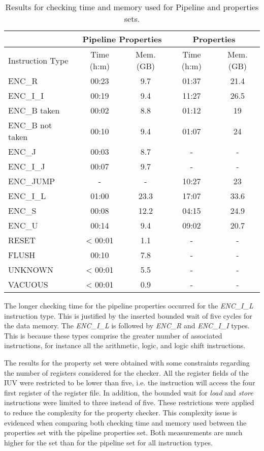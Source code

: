 \begin{table*}[htb!] 
	\centering 
	\caption{Results for checking time and memory used for Pipeline and \SSQED{} properties sets.} 
	\label{tab:pipe-s2qed-check-resutls}
	\begin{tabular}{lcccc}
          & \multicolumn{2}{c}{\textbf{Pipeline Properties}} & \multicolumn{2}{c}{\textbf{\SSQED{} Properties}} \\
          \hline
         Instruction Type & Time (h:m) & Mem.(GB) & Time (h:m) & Mem.(GB)  \\
          \hline
        ENC\_R & 00:23 & 9.7 & 01:37 &  21.4  \\
        ENC\_I\_I & 00:19 & 9.4 & 11:27 &  26.5\\
        ENC\_B taken  & 00:02 & 8.8 & 01:12 & 19\\
        ENC\_B not taken & 00:10 & 9.4 & 01:07 &  24  \\
        ENC\_J & 00:03 & 8.7 & - &  -  \\
        ENC\_I\_J & 00:07 & 9.7 & - &  -  \\
        ENC\_JUMP & - & - & 10:27 &  23  \\
        ENC\_I\_L & 01:00 & 23.3 & 17:07 & 33.6  \\
        ENC\_S & 00:08 & 12.2 & 04:15 &  24.9  \\
        ENC\_U & 00:14 & 9.4 & 09:02 & 20.7  \\
        RESET & < 00:01 & 1.1 & - &  -  \\
        FLUSH & 00:10 & 7.8 & - &  -  \\
        UNKNOWN & < 00:01 & 5.5 & - &  -  \\
        VACUOUS & < 00:01 & 0.9 & - &  -  \\
\end{tabular}
\end{table*}

The longer checking time for the pipeline properties occurred for the \textit{ENC\_I\_L} instruction type. This is justified by the inserted bounded wait of five cycles for the data memory. The \textit{ENC\_I\_L} is followed by \textit{ENC\_R} and \textit{ENC\_I\_I} types. This is because these types comprise the greater number of associated instructions, for instance all the arithmetic, logic, and logic shift instructions.

The results for the \SSQED{} property set were obtained with some constraints regarding the number of registers considered for the checker. All the register fields of the IUV were restricted to be lower than five, i.e. the instruction will access the four first register of the register file. In addition, the bounded wait for \textit{load} and \textit{store} instructions were limited to three instead of five. These restrictions were applied to reduce the complexity for the property checker. This complexity issue is evidenced when comparing both checking time and memory used between the \SSQED{} properties set with the pipeline properties set. Both measurements are much higher for the \SSQED{} set than for the pipeline set for all instruction types.

